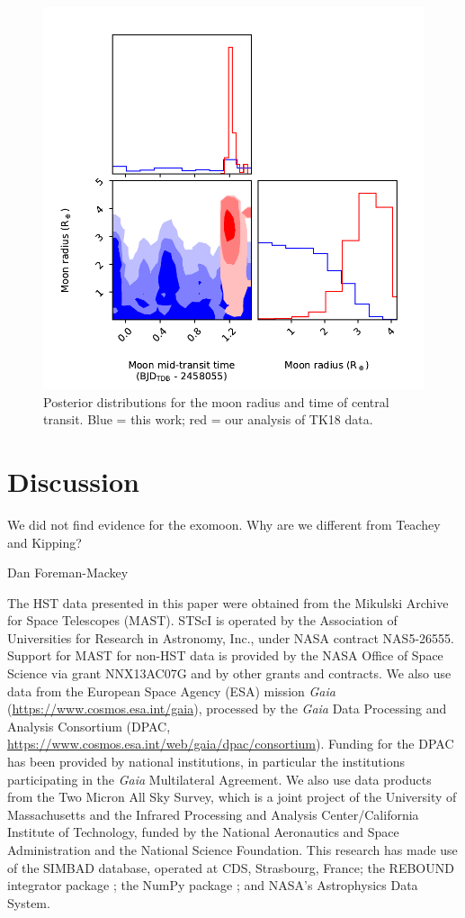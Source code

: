 \documentclass[twocolumn]{aastex62}
\begin{document}
\begin{figure}
\includegraphics[width = 0.5 \textwidth]{figures/fig5_pairs.pdf}
    \caption{Posterior distributions for the moon radius and time of central transit. Blue = this work; red = our analysis of TK18 data.}
\label{fig:corner}
\end{figure}

\section{Discussion}
We did not find evidence for the exomoon. Why are we different from Teachey and Kipping?

\acknowledgments
Dan Foreman-Mackey


The HST data presented in this paper were obtained from the Mikulski Archive for Space Telescopes (MAST). STScI is operated by the Association of Universities for Research in Astronomy, Inc., under NASA contract NAS5-26555. Support for MAST for non-HST data is provided by the NASA Office of Space Science via grant NNX13AC07G and by other grants and contracts.  We also use data from the European Space Agency (ESA) mission {\it Gaia} (\url{https://www.cosmos.esa.int/gaia}), processed by the {\it Gaia} Data Processing and Analysis Consortium (DPAC, \url{https://www.cosmos.esa.int/web/gaia/dpac/consortium}). Funding for the DPAC has been provided by national institutions, in particular the institutions participating in the {\it Gaia} Multilateral Agreement.  We also use data products from the Two Micron All Sky Survey, which is a joint project of the University of Massachusetts and the Infrared Processing and Analysis Center/California Institute of Technology, funded by the National Aeronautics and Space Administration and the National Science Foundation.  This research has made use of the SIMBAD database, operated at CDS, Strasbourg, France; the REBOUND integrator package \citep{rein12}; the NumPy package \citep{van2011numpy}; and NASA's Astrophysics Data System. 




\end{document}
